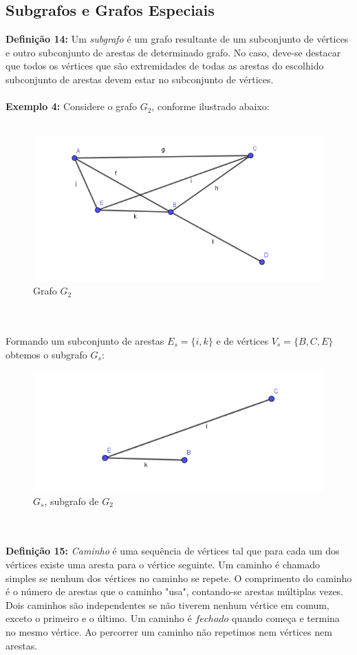 \documentclass[a4paper,12pt]{article}
\begin{document}
	\subsection{Subgrafos e Grafos Especiais}
	\noindent\textbf{Definição 14: }Um \textit{subgrafo} é um grafo resultante de um subconjunto de vértices e outro subconjunto de arestas de determinado grafo. No caso, deve-se destacar que todos os vértices que são extremidades de todas as arestas do escolhido subconjunto de arestas devem estar no subconjunto de vértices.
	\\
	\\
	\textbf{Exemplo 4: }Considere o grafo $G_2$, conforme ilustrado abaixo:
	\\
	\\
	\begin{figure}[h]
		\center
		\includegraphics[width=0.6\linewidth]{Grafo2.png}
		\caption{Grafo $G_2$}
		\label{}
	\end{figure}
	\\
	\\
	Formando um subconjunto de arestas $E_s=\{i,k\}$ e de vértices $V_s=\{B,C,E\}$ obtemos o subgrafo $G_s$:
	\vspace{0.5cm}
	\begin{figure}[h]
		\center
		\includegraphics[width=0.6\linewidth]{subgrafo.png}
		\caption{$G_s$, subgrafo de $G_2$}
		\label{}
	\end{figure}
	\\
	\\
	\textbf{Definição 15:} \textit{Caminho} é uma sequência de vértices tal que para cada um dos vértices existe uma aresta para o vértice seguinte. Um caminho é chamado simples se nenhum dos vértices no caminho se repete. O comprimento do caminho é o número de arestas que o caminho "usa", contando-se arestas múltiplas vezes. Dois caminhos são independentes se não tiverem nenhum vértice em comum, exceto o primeiro e o último. Um caminho é $fechado$ quando começa e termina no mesmo vértice. Ao percorrer um caminho não repetimos nem vértices nem arestas.
\end{document}
